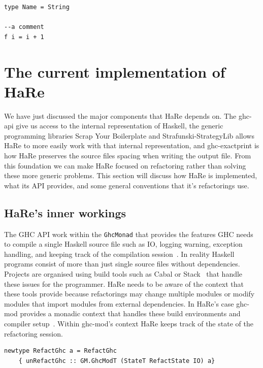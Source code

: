 \begin{lstlisting}
type Name = String

--a comment
f i = i + 1
\end{lstlisting}



\section{The current implementation of HaRe}

We have just discussed the major components that HaRe depends on. The ghc-api give us access to the internal representation of Haskell, the generic programming libraries Scrap Your Boilerplate and Strafunski-StrategyLib allows HaRe to more easily work with that internal representation, and ghc-exactprint is how HaRe preserves the source files spacing when writing the output file. From this foundation we can make HaRe focused on refactoring rather than solving these more generic problems. This section will discuss how HaRe is implemented, what its API provides, and some general conventions that it's refactorings use.

\subsection{HaRe's inner workings}\label{hareInners}

The GHC API work within the \texttt{GhcMonad} that provides the features GHC needs to compile a single Haskell source file such as IO, logging warning, exception handling, and keeping track of the compilation session~\citep{ghcApi}. In reality Haskell programs consist of more than just single source files without dependencies. Projects are organised using build tools such as Cabal or Stack~\citep{cabal,stack} that handle these issues for the programmer. HaRe needs to be aware of the context that these tools provide because refactorings may change multiple modules or modify modules that import modules from external dependencies. In HaRe's case ghc-mod provides a monadic context that handles these build environments and compiler setup~\citep{ghcMod}. Within ghc-mod's context HaRe keeps track of the state of the refactoring session.

\begin{lstlisting}[caption={HaRe's Monad \texttt{RefactGhc}},captionpos=b, label=refactghc] 
newtype RefactGhc a = RefactGhc
    { unRefactGhc :: GM.GhcModT (StateT RefactState IO) a}
\end{lstlisting}

